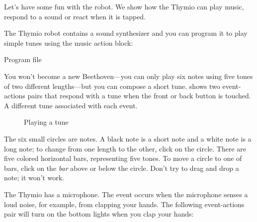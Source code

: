 \label{ch.bells}

Let's have some fun with the robot. We show how the Thymio can play
music, respond to a sound or react when it is tapped.


The Thymio robot contains a sound synthesizer and you can program it
to play simple tunes using the music action block: 

{\raggedleft \hfill Program file }

You won't become a new Beethoven---you can only play six notes using
five tones of two different lengths---but you can compose a short tune.
 shows two event-actions pairs that respond with a tune
when the front or back button is touched. A different tune associated
with each event.

\begin{figure}
\begin{center}
\caption{Playing a tune}\label{fig.music}
\end{center}
\end{figure}

The six small circles are notes. A black note is a short note and a
white note is a long note; to change from one length to the other, click
on the circle. There are five colored horizontal bars, representing five
tones. To move a circle to one of bars, click on the \emph{bar} above or
below the circle. Don't try to drag and drop a note; it won't work.




The Thymio has a microphone. The event  occurs
when the microphone senses a loud noise, for example, from clapping your
hands. The following event-actions pair will turn on the bottom lights
when you clap your hands:


\bigskip


